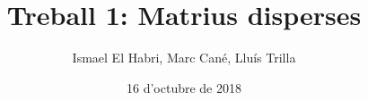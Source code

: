\documentclass[11pt,a4paper,twoside]{report}
\begin{document}
\title{Treball 1: Matrius disperses}
\author{Ismael El Habri, Marc Cané, Lluís Trilla}
\date{16 d'octubre de 2018}
\maketitle

\tableofcontents
\end{document}
